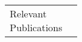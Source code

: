 \begin{center}
{\begin{tabular}{@{}p{25mm}|p{190mm}@{}}
{} \tabularnewline\hline\Tstrut
\pbox{8cm}{\Tstrut Relevant\\Publications} &%
{\vspace{-3mm}
}\tabularnewline\hline

\end{tabular}
}%
\end{center}